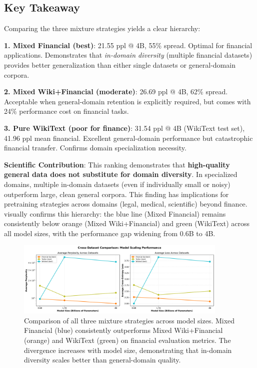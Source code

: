 

\subsection{Key Takeaway}

Comparing the three mixture strategies yields a clear hierarchy:

\textbf{1. Mixed Financial (best)}: 21.55 ppl @ 4B, 55\% spread. Optimal for financial applications. Demonstrates that \textit{in-domain diversity} (multiple financial datasets) provides better generalization than either single datasets or general-domain corpora.

\textbf{2. Mixed Wiki+Financial (moderate)}: 26.69 ppl @ 4B, 62\% spread. Acceptable when general-domain retention is explicitly required, but comes with 24\% performance cost on financial tasks.

\textbf{3. Pure WikiText (poor for finance)}: 31.54 ppl @ 4B (WikiText test set), 41.96 ppl mean financial. Excellent general-domain performance but catastrophic financial transfer. Confirms domain specialization necessity.

\textbf{Scientific Contribution}: This ranking demonstrates that \textbf{high-quality general data does not substitute for domain diversity}. In specialized domains, multiple in-domain datasets (even if individually small or noisy) outperform large, clean general corpora. This finding has implications for pretraining strategies across domains (legal, medical, scientific) beyond finance.  visually confirms this hierarchy: the blue line (Mixed Financial) remains consistently below orange (Mixed Wiki+Financial) and green (WikiText) across all model sizes, with the performance gap widening from 0.6B to 4B.

\begin{figure}[h]
\centering
\includegraphics[width=0.9\textwidth]{figures/scaling_comparison_all.png}
\caption[Comparison of Mixture Strategies]{Comparison of all three mixture strategies across model sizes. Mixed Financial (blue) consistently outperforms Mixed Wiki+Financial (orange) and WikiText (green) on financial evaluation metrics. The divergence increases with model size, demonstrating that in-domain diversity scales better than general-domain quality.}
\label{fig:scaling_comparison_all}
\end{figure}

